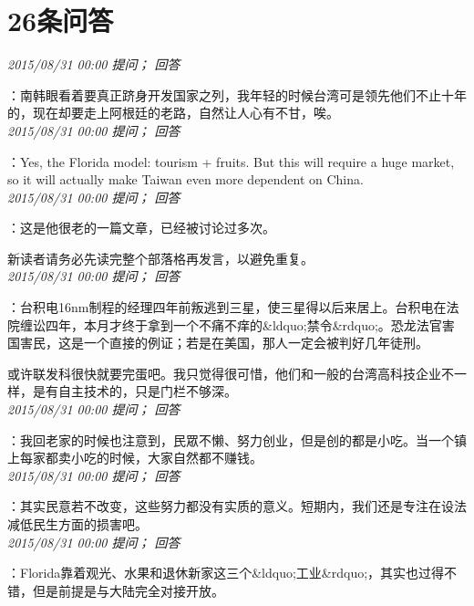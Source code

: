 \documentclass[twocolumn]{ctexart}
\begin{document}
\section{26条问答}

\textit{\hfill\noindent\small 2015/08/31 00:00 提问； 回答}

：南韩眼看着要真正跻身开发国家之列，我年轻的时候台湾可是领先他们不止十年的，现在却要走上阿根廷的老路，自然让人心有不甘，唉。\\

\textit{\hfill\noindent\small 2015/08/31 00:00 提问； 回答}

：Yes, the Florida model: tourism + fruits. But this will require a huge market, so it will actually make Taiwan even more dependent on China.\\

\textit{\hfill\noindent\small 2015/08/31 00:00 提问； 回答}

：这是他很老的一篇文章，已经被讨论过多次。

新读者请务必先读完整个部落格再发言，以避免重复。\\

\textit{\hfill\noindent\small 2015/08/31 00:00 提问； 回答}

：台积电16nm制程的经理四年前叛逃到三星，使三星得以后来居上。台积电在法院缠讼四年，本月才终于拿到一个不痛不痒的\&ldquo;禁令\&rdquo;。恐龙法官害国害民，这是一个直接的例证；若是在美国，那人一定会被判好几年徒刑。

或许联发科很快就要完蛋吧。我只觉得很可惜，他们和一般的台湾高科技企业不一样，是有自主技术的，只是门栏不够深。\\

\textit{\hfill\noindent\small 2015/08/31 00:00 提问； 回答}

：我回老家的时候也注意到，民眾不懒、努力创业，但是创的都是小吃。当一个镇上每家都卖小吃的时候，大家自然都不赚钱。\\

\textit{\hfill\noindent\small 2015/08/31 00:00 提问； 回答}

：其实民意若不改变，这些努力都没有实质的意义。短期内，我们还是专注在设法减低民生方面的损害吧。\\

\textit{\hfill\noindent\small 2015/08/31 00:00 提问； 回答}

：Florida靠着观光、水果和退休新家这三个\&ldquo;工业\&rdquo;，其实也过得不错，但是前提是与大陆完全对接开放。
\end{document}
